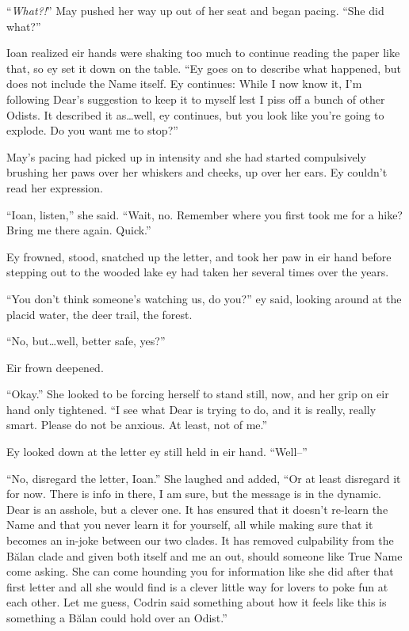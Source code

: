 ``\emph{What?!}'' May pushed her way up out of her seat and began pacing. ``She did what?''

Ioan realized eir hands were shaking too much to continue reading the paper like that, so ey set it down on the table. ``Ey goes on to describe what happened, but does not include the Name itself. Ey continues: While I now know it, I'm following Dear's suggestion to keep it to myself lest I piss off a bunch of other Odists. It described it as\ldots well, ey continues, but you look like you're going to explode. Do you want me to stop?''

May's pacing had picked up in intensity and she had started compulsively brushing her paws over her whiskers and cheeks, up over her ears. Ey couldn't read her expression.

``Ioan, listen,'' she said. ``Wait, no. Remember where you first took me for a hike? Bring me there again. Quick.''

Ey frowned, stood, snatched up the letter, and took her paw in eir hand before stepping out to the wooded lake ey had taken her several times over the years.

``You don't think someone's watching us, do you?'' ey said, looking around at the placid water, the deer trail, the forest.

``No, but\ldots well, better safe, yes?''

Eir frown deepened.

``Okay.'' She looked to be forcing herself to stand still, now, and her grip on eir hand only tightened. ``I see what Dear is trying to do, and it is really, really smart. Please do not be anxious. At least, not of me.''

Ey looked down at the letter ey still held in eir hand. ``Well--''

``No, disregard the letter, Ioan.'' She laughed and added, ``Or at least disregard it for now. There is info in there, I am sure, but the message is in the dynamic. Dear is an asshole, but a clever one. It has ensured that it doesn't re-learn the Name and that you never learn it for yourself, all while making sure that it becomes an in-joke between our two clades. It has removed culpability from the Bălan clade and given both itself and me an out, should someone like True Name come asking. She can come hounding you for information like she did after that first letter and all she would find is a clever little way for lovers to poke fun at each other. Let me guess, Codrin said something about how it feels like this is something a Bălan could hold over an Odist.''

